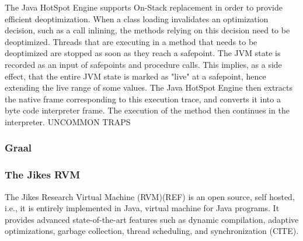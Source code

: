 The Java HotSpot Engine supports On-Stack replacement in order to provide efficient deoptimization.
When a class loading invalidates an optimization decision, such as a call inlining, the methods relying on this decision need to be deoptimized.
Threads that are executing in a method that needs to be deoptimized are stopped as soon as they reach a safepoint.
The JVM state is recorded as an input of safepoints and procedure calls.
This implies, as a side effect, that the entire JVM state is marked as "live" at a safepoint, hence extending the live range of some values.
The Java HotSpot Engine then extracts the native frame corresponding to this execution trace, and converts it into a byte code interpreter frame.
The execution of the method then continues in the interpreter.
UNCOMMON TRAPS

\subsubsection{Graal}
\subsubsection{The Jikes RVM}
The Jikes Research Virtual Machine (RVM)(REF) is an open source, self hosted, i.e., it is entirely implemented in Java, virtual machine for Java programs.
It provides advanced state-of-the-art features such as dynamic compilation, adaptive optimizations, garbage collection, thread scheduling, and synchronization (CITE).\\

